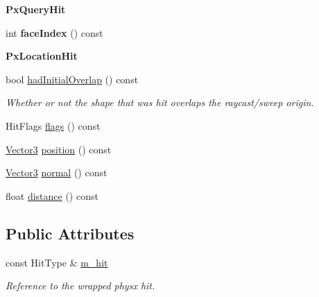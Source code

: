 \begin{Indent}\textbf{ Px\+Query\+Hit}\par
\begin{DoxyCompactItemize}
\item 
\mbox{\label{classrev_1_1_physics_hit_aad368c6a98e8011939ed9281f7df4528}} 
int {\bfseries face\+Index} () const
\end{DoxyCompactItemize}
\end{Indent}
\begin{Indent}\textbf{ Px\+Location\+Hit}\par
\begin{DoxyCompactItemize}
\item 
bool \mbox{\hyperlink{classrev_1_1_physics_hit_a35a730fac78b7f3ced9731ce4ca77f67}{had\+Initial\+Overlap}} () const
\begin{DoxyCompactList}\small\item\em Whether or not the shape that was hit overlaps the raycast/sweep origin. \end{DoxyCompactList}\item 
Hit\+Flags \mbox{\hyperlink{classrev_1_1_physics_hit_a566ec817e8cc196b3c90436a26c92b65}{flags}} () const
\item 
\mbox{\hyperlink{classrev_1_1_vector}{Vector3}} \mbox{\hyperlink{classrev_1_1_physics_hit_a8f76cef390749e030ba96acb1f85d6fd}{position}} () const
\item 
\mbox{\hyperlink{classrev_1_1_vector}{Vector3}} \mbox{\hyperlink{classrev_1_1_physics_hit_a9c2fccb821c7e4e2e2bb42527e23e781}{normal}} () const
\item 
float \mbox{\hyperlink{classrev_1_1_physics_hit_a62d6dd0cd3715a1e6b0b028815c03074}{distance}} () const
\end{DoxyCompactItemize}
\end{Indent}
\subsection*{Public Attributes}
\begin{DoxyCompactItemize}
\item 
\mbox{\label{classrev_1_1_physics_hit_a89ad2b34c4b530465191acd69b19539d}} 
const Hit\+Type \& \mbox{\hyperlink{classrev_1_1_physics_hit_a89ad2b34c4b530465191acd69b19539d}{m\+\_\+hit}}
\begin{DoxyCompactList}\small\item\em Reference to the wrapped physx hit. \end{DoxyCompactList}\end{DoxyCompactItemize}
